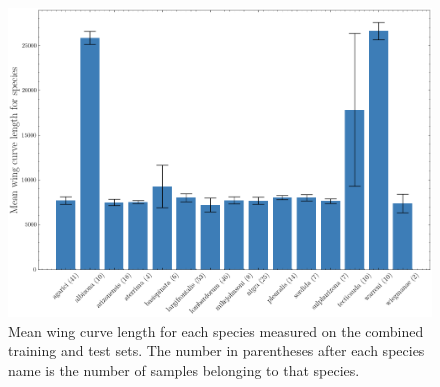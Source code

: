 \begin{figure}[H]
  \centering
  \includegraphics[width=\textwidth]{figures/task_3_wing_lens.png}
  \caption{Mean wing curve length for each species measured on the combined
  training and test sets. The number in parentheses after each species name is
  the number of samples belonging to that species.}
  \label{fig:wing_lens}
\end{figure}
